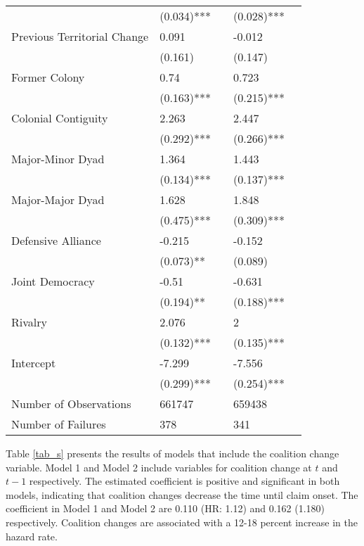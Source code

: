 \begin{table}[htpb]
\begin{tabular}{lllll}
		& (0.034)*** &           & (0.028)*** &          \\
		Previous Territorial Change & 0.091      &           & -0.012     &          \\
		& (0.161)    &           & (0.147)    &          \\
		Former Colony               & 0.74       &           & 0.723      &          \\
		& (0.163)*** &           & (0.215)*** &          \\
		Colonial Contiguity         & 2.263      &           & 2.447      &          \\
		& (0.292)*** &           & (0.266)*** &          \\
		Major-Minor Dyad            & 1.364      &           & 1.443      &          \\
		& (0.134)*** &           & (0.137)*** &          \\
		Major-Major Dyad            & 1.628      &           & 1.848      &          \\
		& (0.475)*** &           & (0.309)*** &          \\
		Defensive Alliance          & -0.215     &           & -0.152     &          \\
		& (0.073)**  &           & (0.089)    &          \\
		Joint Democracy             & -0.51      &           & -0.631     &          \\
		& (0.194)**  &           & (0.188)*** &          \\
		Rivalry                     & 2.076      &           & 2          &          \\
		& (0.132)*** &           & (0.135)*** &          \\
		Intercept                   & -7.299     &           & -7.556     &          \\
		& (0.299)*** &           & (0.254)*** &          \\
		Number of Observations      & 661747     &          & 659438     &         \\
		Number of Failures          & 378        &          & 341        &         \\ \hline
	\end{tabular}
\end{table}

Table \ref{tab_s} presents the results of models that include the coalition change variable. Model 1 and Model 2 include variables for coalition change at $t$ and $t-1$ respectively. The estimated coefficient is positive and significant in both models, indicating that coalition changes decrease the time until claim onset. The coefficient in Model 1 and Model 2 are 0.110 (HR: 1.12) and 0.162 (1.180) respectively. Coalition changes are associated with a 12-18 percent increase in the hazard rate.

